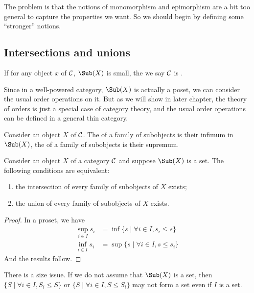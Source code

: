 The problem is that the notions of monomorphism and epimorphism are a bit too general to capture the properties we want. So we should begin by defining some ``stronger'' notions.

\subsection{Intersections and unions}
\begin{defn}
  If for any object $x$ of ${\cal C}$, $\Sub(X)$ is small, the we say ${\cal C}$ is .
\end{defn}
Since in a well-powered category, $\Sub(X)$ is actually a poset, we can consider the usual order operations on it. But as we will show in later chapter, the theory of orders is just a special case of category theory, and the usual order operations can be defined in a general thin category.
\begin{defn}
  Consider an object $X$ of ${\cal C}$. The  of a family of subobjects is their infimum in $\Sub(X)$, the  of a family of subobjects is their supremum.
\end{defn}
\begin{prop}\label{prop:compute intersection and union}
  Consider an object $X$ of a category ${\cal C}$ and suppose $\Sub(X)$ is a set. The following conditions are equivalent:
\begin{enumerate}
  \item  the intersection of every family of subobjects of $X$ exists;
  \item  the union of every family of subobjects of $X$ exists.
\end{enumerate}
\end{prop}
\begin{proof}
  In a proset, we have
  \begin{align*}
    \sup_{i\in I}s_i &= \inf\{s\mid\forall i\in I, s_i \leqslant s\}\\
    \inf_{i\in I}s_i &= \sup\{s\mid\forall i\in I, s \leqslant s_i\}
  \end{align*}
  And the results follow.
\end{proof}
\begin{rem}
  There is a size issue. If we do not assume that $\Sub(X)$ is a set, then $\{S\mid\forall i\in I, S_i \leqslant S\}$ or $\{S\mid\forall i\in I, S \leqslant S_i\}$ may not form a set even if $I$ is a set.
\end{rem}


